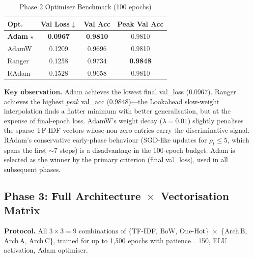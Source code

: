 \documentclass[10pt,conference,letterpaper]{IEEEtran}
\begin{document}
\begin{table}[h]
  \centering
  \caption{Phase 2 Optimiser Benchmark (100 epochs)}
  \label{tab:opt}
  \renewcommand{\arraystretch}{1.1}
  \begin{tabular}{lccc}
    \toprule
    \rowcolor{lightblue}
    \textbf{Opt.} & \textbf{Val Loss$\downarrow$} &
    \textbf{Val Acc} & \textbf{Peak Val Acc} \\
    \midrule
    \rowcolor{rowblue}
    \textbf{Adam} $\boldsymbol{\star}$
      & \textbf{0.0967} & \textbf{0.9810} & 0.9810 \\
    AdamW  & 0.1209 & 0.9696 & 0.9810 \\
    \rowcolor{rowblue}
    Ranger & 0.1258 & 0.9734 & \textbf{0.9848} \\
    RAdam  & 0.1528 & 0.9658 & 0.9810 \\
    \bottomrule
  \end{tabular}
\end{table}

\textbf{Key observation.} Adam achieves the lowest final val\_loss (0.0967).
Ranger achieves the highest \emph{peak} val\_acc (0.9848)---the Lookahead
slow-weight interpolation finds a flatter minimum with better generalisation,
but at the expense of final-epoch loss. AdamW's weight decay ($\lambda=0.01$)
slightly penalises the sparse TF-IDF vectors whose non-zero entries carry the
discriminative signal. RAdam's conservative early-phase behaviour (SGD-like
updates for $\rho_t\le5$, which spans the first $\sim$7 steps) is a disadvantage
in the 100-epoch budget. Adam is selected as the winner by the primary criterion
(final val\_loss), used in all subsequent phases.

\subsection{Phase 3: Full Architecture~$\times$~Vectorisation Matrix}

\textbf{Protocol.} All $3\times3=9$ combinations of
\{TF-IDF, BoW, One-Hot\}~$\times$~\{Arch\,B, Arch\,A, Arch\,C\}, trained
for up to 1{,}500 epochs with patience\,=\,150, ELU activation, Adam optimiser.
\end{document}
